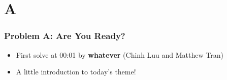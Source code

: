 \section{A}%
\label{sec:a}

\begin{frame}
  \frametitle{Problem A: Are You Ready?}

  \begin{itemize}
    \item First solve at 00:01 by \textbf{whatever} (Chinh Luu and Matthew Tran)
    \item A little introduction to today's theme!
  \end{itemize}

\end{frame}
